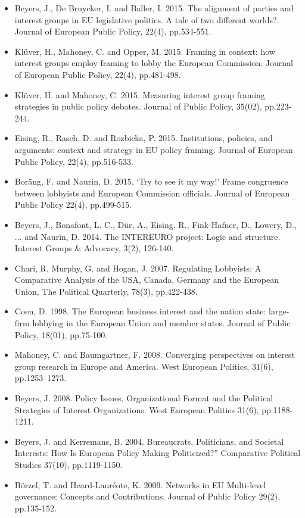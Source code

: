 \begin{itemize}
	\item Beyers, J., De Bruycker, I. and Baller, I. 2015. The alignment of parties and interest groups in EU legislative politics. A tale of two different worlds?. Journal of European Public Policy, 22(4), pp.534-551.
	\item Kl{\"u}ver, H., Mahoney, C. and Opper, M. 2015. Framing in context: how interest groups employ framing to lobby the European Commission. Journal of European Public Policy, 22(4), pp.481-498.
	\item Kl{\"u}ver, H. and Mahoney, C. 2015. Measuring interest group framing strategies in public policy debates. Journal of Public Policy, 35(02), pp.223-244.
	\item Eising, R., Rasch, D. and Rozbicka, P. 2015. Institutions, policies, and arguments: context and strategy in EU policy framing. Journal of European Public Policy, 22(4), pp.516-533.
	\item Bor{\"a}ng, F. and Naurin, D. 2015. `Try to see it my way!' Frame congruence between lobbyists and European Commission officials. Journal of European Public Policy 22(4), pp.499-515.
	\item Beyers, J., Bonafont, L. C., D{\"u}r, A., Eising, R., Fink-Hafner, D., Lowery, D., ... and Naurin, D. 2014. The INTEREURO project: Logic and structure. Interest Groups \& Advocacy, 3(2), 126-140.
	\item Chari, R. Murphy, G. and Hogan, J. 2007. Regulating Lobbyists: A Comparative Analysis of the USA, Canada, Germany and the European Union, The Political Quarterly, 78(3), pp.422-438.
	\item Coen, D. 1998. The European business interest and the nation state: large-firm lobbying in the European Union and member states. Journal of Public Policy, 18(01), pp.75-100.
	\item Mahoney, C. and Baumgartner, F. 2008. Converging perspectives on interest group research in Europe and America. West European Politics, 31(6), pp.1253–1273.
	\item Beyers, J. 2008. Policy Issues, Organizational Format and the Political Strategies of Interest Organizations. West European Politics 31(6), pp.1188-1211.
	\item Beyers, J. and Kerremans, B. 2004. Bureaucrats, Politicians, and Societal Interests: How Is European Policy Making Politicized?” Comparative Political Studies 37(10), pp.1119-1150.
	\item B{\"o}rzel, T. and Heard-Lauréote, K. 2009. Networks in EU Multi-level governance: Concepts and Contributions. Journal of Public Policy 29(2), pp.135-152.

\end{itemize}

